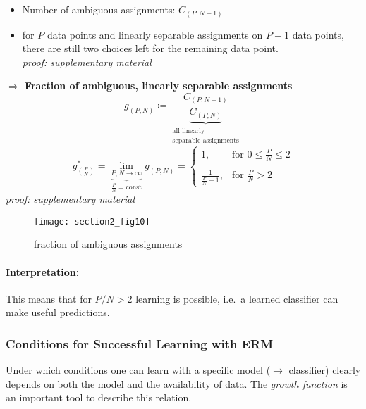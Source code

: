 \begin{itemize}
\item Number of ambiguous assignments: $C_{(P,N-1)}$
\item for $P$ data points and linearly separable assignments on $P-1$ data points, there are still two choices left for the remaining data point.\\
{\it proof: supplementary material}
\end{itemize}
\textbf{$\Rightarrow$ Fraction of ambiguous, linearly separable assignments}
\begin{equation}
	g_{(P,N)} \coloneqq \frac{ C_{(P,N-1)} }{
	 \underbrace{ C_{(P,N)}  }_{ \substack{\text{all linearly} \\ \text{separable assignments}}} }
\end{equation}
\begin{equation}
	g_{(\frac{P}{N})}^* = \underbrace{\lim_{P,N \rightarrow \infty}}_{
				\frac{P}{N} = \mathrm{const} }
	g_{(P,N)} = \left \{ \begin{array}{ll}
		1, 
			& \text{for } 0 \leq \frac{P}{N} \leq 2 \\\\
		\frac{1}{ \frac{P}{N} - 1},
			& \text{for } \frac{P}{N} > 2
	\end{array} \right.
\end{equation}
{\it proof: supplementary material}

\begin{figure}[h]
  \centering
\texttt{[image: section2\_fig10]}  
  \caption{fraction of ambiguous assignments}
\end{figure}


\paragraph{Interpretation:} \label{sec:interpretation} This means that
for $P/N>2$ learning is possible, i.e.\ a learned classifier
can make useful predictions.


\subsubsection{Conditions for Successful Learning with ERM}
Under which conditions one can learn with a specific model
($\rightarrow$ classifier) clearly depends on both the model and the
availability of data. The \emph{growth function} is an important tool
to describe this relation.

